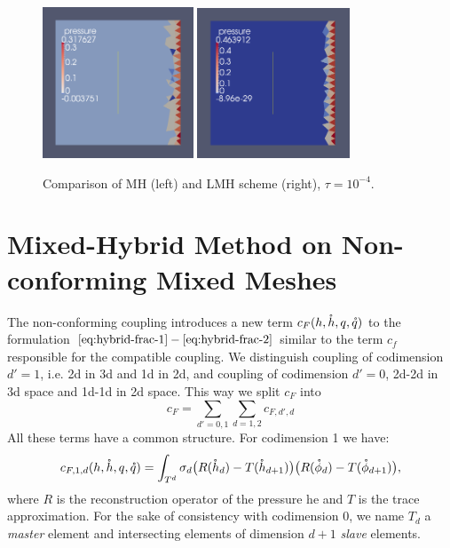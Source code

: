 \begin{figure}
    \begin{center}
       \includegraphics[width=0.4\textwidth]{figures/MH.png}
       \includegraphics[width=0.405\textwidth]{figures/LMH.png}        
    \end{center}
    \caption{Comparison of MH (left) and LMH scheme (right), $\tau=10^{-4}$.}
    \label{fig:LMH}
\end{figure}

\section{Mixed-Hybrid Method on Non-conforming Mixed Meshes}
The non-conforming coupling introduces a new term $c_F(h, \mathring h, q, \mathring q)$ to the formulation $\eqref{eq:hybrid-frac-1} - 
\eqref{eq:hybrid-frac-2}$ similar to the term $c_f$ responsible for the compatible coupling. We distinguish coupling of codimension $d'=1$, i.e. 2d in 3d and 1d in 2d,
and coupling of codimension $d'=0$, 2d-2d in 3d space and 1d-1d in 2d space. This way we split $c_F$ into
\[
    c_F= \sum_{d'=0,1} \sum_{d=1,2} c_{F,d',d}
\]
All these terms have a common structure. For codimension 1 we have:
\begin{equation*}
  c_{F,1,d}(h, \mathring h, q, \mathring q) =  \int_{T^d} \sigma_d
                \big(R({\mathring{h}_d}) - T({\mathring{h}_{d+1}}) \big)
                 \big(R({\mathring{\phi}_d}) - T({\mathring{\phi}_{d+1}}) \big),
\end{equation*}
where $R$ is the reconstruction operator of the pressure he and $T$ is the trace approximation.
For the sake of consistency with codimension $0$, we name $T_d$ a \emph{master} element and 
intersecting elements of dimension $d+1$ \emph{slave} elements.


